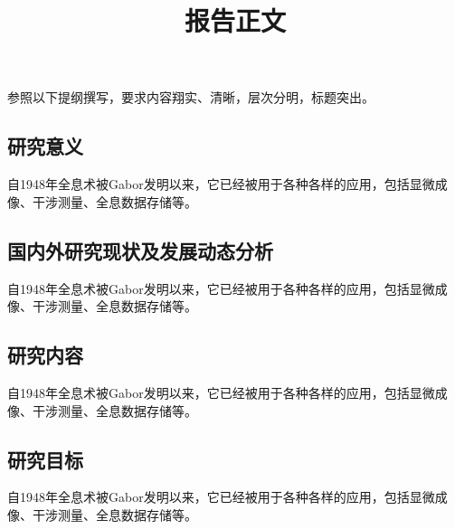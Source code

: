 \documentclass[a4paper, 12pt]{extarticle}
\begin{document}
\title{报告正文}
\maketitle
\thispagestyle{empty}
{\large 参照以下提纲撰写，要求内容翔实、清晰，层次分明，标题突出。}



\subsection{研究意义}

自1948年全息术被Gabor发明以来\cite{Gabor_1948_nature}，它已经被用于各种各样的应用，包括显微成像、干涉测量、全息数据存储等\cite{Goodman_2005}。


\subsection{国内外研究现状及发展动态分析}

自1948年全息术被Gabor发明以来\cite{Gabor_1948_nature}，它已经被用于各种各样的应用，包括显微成像、干涉测量、全息数据存储等\cite{Goodman_2005}。

{\small


}


\subsection{研究内容}
自1948年全息术被Gabor发明以来\cite{Gabor_1948_nature}，它已经被用于各种各样的应用，包括显微成像、干涉测量、全息数据存储等\cite{Goodman_2005}。

\subsection{研究目标}
自1948年全息术被Gabor发明以来\cite{Gabor_1948_nature}，它已经被用于各种各样的应用，包括显微成像、干涉测量、全息数据存储等\cite{Goodman_2005}。
\end{document}
